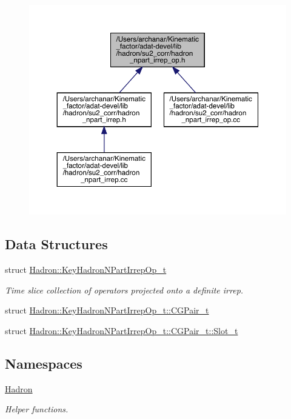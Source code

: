 \begin{figure}[H]
\begin{center}
\leavevmode
\includegraphics[width=350pt]{d2/d43/adat-devel_2lib_2hadron_2su2__corr_2hadron__npart__irrep__op_8h__dep__incl}
\end{center}
\end{figure}
\subsection*{Data Structures}
\begin{DoxyCompactItemize}
\item 
struct \mbox{\hyperlink{structHadron_1_1KeyHadronNPartIrrepOp__t}{Hadron\+::\+Key\+Hadron\+N\+Part\+Irrep\+Op\+\_\+t}}
\begin{DoxyCompactList}\small\item\em Time slice collection of operators projected onto a definite irrep. \end{DoxyCompactList}\item 
struct \mbox{\hyperlink{structHadron_1_1KeyHadronNPartIrrepOp__t_1_1CGPair__t}{Hadron\+::\+Key\+Hadron\+N\+Part\+Irrep\+Op\+\_\+t\+::\+C\+G\+Pair\+\_\+t}}
\item 
struct \mbox{\hyperlink{structHadron_1_1KeyHadronNPartIrrepOp__t_1_1CGPair__t_1_1Slot__t}{Hadron\+::\+Key\+Hadron\+N\+Part\+Irrep\+Op\+\_\+t\+::\+C\+G\+Pair\+\_\+t\+::\+Slot\+\_\+t}}
\end{DoxyCompactItemize}
\subsection*{Namespaces}
\begin{DoxyCompactItemize}
\item 
 \mbox{\hyperlink{namespaceHadron}{Hadron}}
\begin{DoxyCompactList}\small\item\em Helper functions. \end{DoxyCompactList}\end{DoxyCompactItemize}
